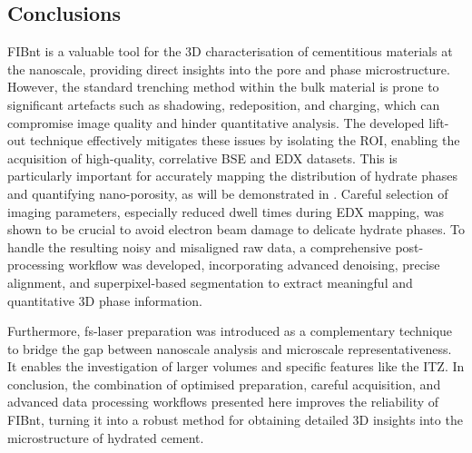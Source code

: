 \subsection{Conclusions}

\ac{FIBnt} is a valuable tool for the 3D characterisation of cementitious materials at the nanoscale, providing direct insights into the pore and phase microstructure.
However, the standard trenching method within the bulk material is prone to significant artefacts such as shadowing, redeposition, and charging, which can compromise image quality and hinder quantitative analysis.
The developed lift-out technique effectively mitigates these issues by isolating the \ac{ROI}, enabling the acquisition of high-quality, correlative \ac{BSE} and \ac{EDX} datasets.
This is particularly important for accurately mapping the distribution of hydrate phases and quantifying nano-porosity, as will be demonstrated in .
Careful selection of imaging parameters, especially reduced dwell times during \ac{EDX} mapping, was shown to be crucial to avoid electron beam damage to delicate hydrate phases.
To handle the resulting noisy and misaligned raw data, a comprehensive post-processing workflow was developed, incorporating advanced denoising, precise alignment, and superpixel-based segmentation to extract meaningful and quantitative 3D phase information.

Furthermore, \ac{fs-laser} preparation was introduced as a complementary technique to bridge the gap between nanoscale analysis and microscale representativeness.
It enables the investigation of larger volumes and specific features like the \ac{ITZ}.
In conclusion, the combination of optimised preparation, careful acquisition, and advanced data processing workflows presented here improves the reliability of \ac{FIBnt}, turning it into a robust method for obtaining detailed 3D insights into the microstructure of hydrated cement.
